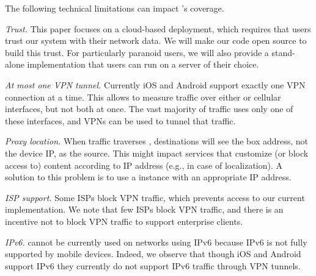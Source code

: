  The following technical limitations can impact \meddle's coverage.

\noindent\emph{Trust.} This paper focuses on a cloud-based \meddle deployment, which requires 
that users trust our system with their network data. We will make our code open source to build this 
trust. For particularly paranoid users, we will also provide a stand-alone implementation that users 
can run on a server of their choice.

\noindent\emph{At most one VPN tunnel.}
Currently iOS and Android support exactly one VPN connection at a time. 
This allows \meddle to measure traffic over either \wifi or cellular interfaces, but not both at once.
The vast majority of traffic uses only one of these interfaces, and VPNs can be used to tunnel that traffic.

\noindent\emph{Proxy location.} 
When traffic traverses \meddle, destinations will see the \meddle box address, not the device IP, as the source. 
This might impact services  that customize (or block access to) content according to IP address (e.g., in case of localization). 
A solution to this problem is to use a \meddle{} instance with an appropriate IP address.

\noindent\emph{ISP support.}
Some ISPs block VPN traffic, which prevents access to our current \meddle implementation. 
We note that few ISPs block VPN traffic, and there is an incentive not to block VPN traffic to 
support enterprise clients.

\noindent\emph{IPv6.}
\meddle{} cannot be currently used on networks using IPv6 because IPv6 is not fully supported by mobile devices. 
Indeed, we observe that though iOS and Android support IPv6 they currently do not support IPv6 traffic through VPN tunnels.




